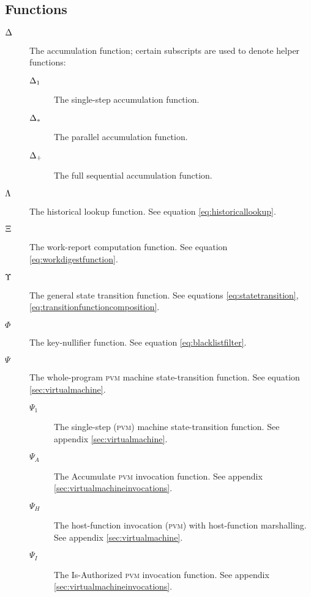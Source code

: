 \subsection{Functions}

\begin{description}
  \item[$\Delta$] The accumulation function; certain subscripts are used to denote helper functions: %
  \begin{description}
    \item[$\Delta_1$] The single-step accumulation function.
    \item[$\Delta_*$] The parallel accumulation function.
    \item[$\Delta_+$] The full sequential accumulation function.
  \end{description}
  \item[$\Lambda$] The historical lookup function. See equation \ref{eq:historicallookup}. %
  \item[$\Xi$] The work-report computation function. See equation \ref{eq:workdigestfunction}. %
  \item[$\Upsilon$] The general state transition function. See equations \ref{eq:statetransition}, \ref{eq:transitionfunctioncomposition}. %
  \item[$\Phi$] The key-nullifier function. See equation \ref{eq:blacklistfilter}. %
  \item[$\Psi$] The whole-program \textsc{pvm} machine state-transition function. See equation \ref{sec:virtualmachine}. %
  \begin{description}
    \item[$\Psi_1$] The single-step (\textsc{pvm}) machine state-transition function. See appendix \ref{sec:virtualmachine}. %
    \item[$\Psi_A$] The Accumulate \textsc{pvm} invocation function. See appendix \ref{sec:virtualmachineinvocations}.
    \item[$\Psi_H$] The host-function invocation (\textsc{pvm}) with host-function marshalling. See appendix \ref{sec:virtualmachine}. %
    \item[$\Psi_I$] The Is-Authorized \textsc{pvm} invocation function. See appendix \ref{sec:virtualmachineinvocations}.

\end{description}
\end{description}
